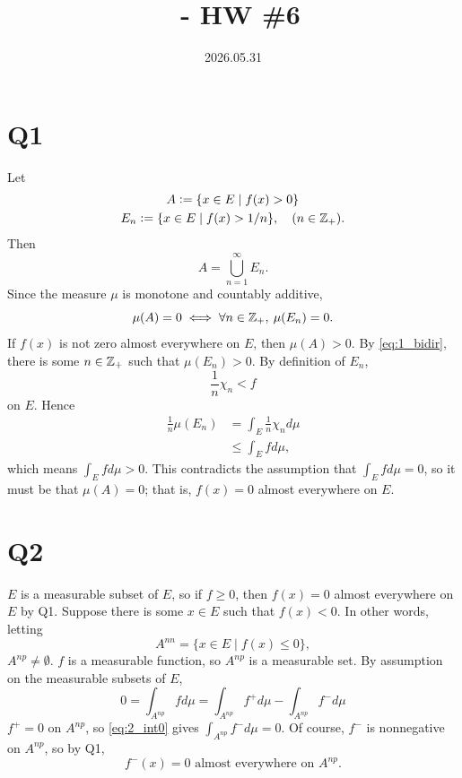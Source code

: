 \documentclass[12pt]{article}
\title{\course\ - HW \#6}
\author{\myname}
\date{2026.05.31}
\begin{document}
\maketitle
\thispagestyle{fancy}

\newcommand{\M}{\mathcal{M}}
\newcommand{\scrC}{\mathscr{C}}
\newcommand{\sigalg}[1]{\sigma\text{-alg}(#1)}

\section*{Q1} 
Let 
\begin{gather*}
  A \vcentcolon= \{x \in E \mid f(x) > 0\} \\ 
  E_n \vcentcolon= \{x \in E \mid f(x) > 1 / n \}, \quad (n \in \mathbb{Z}_{+}).
\end{gather*}
Then 
$$A = \bigcup_{n = 1}^{\infty} E_n.$$
Since the measure $\mu$ is monotone and countably additive, 
\begin{equation} \label{eq:1_bidir} 
\mu(A) = 0 \iff \forall n \in \mathbb{Z}_{+}, \: \mu(E_n) = 0.
\end{equation}
If $f(x)$ is not zero almost everywhere on $E$, then $\mu(A) > 0$. 
By \eqref{eq:1_bidir}, there is some $n \in \mathbb{Z}_{+}$ such that $\mu(E_n) > 0$. 
By definition of $E_n$, 
$$\frac{1}{n} \chi_n < f$$ 
on $E$. 
Hence 
\begin{align*} 
  \frac{1}{n}\mu(E_n) & = \int_{E}\frac{1}{n} \chi_n d\mu \\  
					  & \leq \int_{E} f d\mu,
\end{align*}
which means $\int_{E} f d\mu > 0$. 
This contradicts the assumption that $\int_{E} f d\mu = 0$, so it must be that $\mu(A) = 0$; 
that is, $f(x) = 0$ almost everywhere on $E$. 

\section*{Q2} 
$E$ is a measurable subset of $E$, so if $f \geq 0$, then $f(x) = 0$ almost everywhere on $E$ by Q1. 
Suppose there is some $x \in E$ such that $f(x) < 0$. 
In other words, letting 
$$A^{nn} = \{x \in E \mid f(x) \leq 0\},$$
$A^{np} \neq \emptyset$. 
$f$ is a measurable function, so $A^{np}$ is a measurable set. 
By assumption on the measurable subsets of $E$, 
\begin{equation} \label{eq:2_int0} 
  0 = \int_{A^{np}} fd\mu = \int_{A^{np}} f^{+} d\mu - \int_{A^{np}} f^{-} d\mu 
\end{equation}
$f^{+} = 0$ on $A^{np}$, so \eqref{eq:2_int0} gives $\int_{A^{np}} f^{-} d\mu = 0$. 
Of course, $f^{-}$ is nonnegative on $A^{np}$, so by Q1, 
\begin{equation} \label{eq:2_0ae} 
  f^{-}(x) = 0 \text{ almost everywhere on } A^{np}.
\end{equation}
\end{document}
